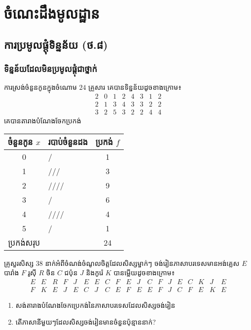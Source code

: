 \documentclass[a4paper,12pt,blue]{pptec}
\begin{document}
	\tableofcontents
	\part{ចំណេះដឹងមូលដ្ឋាន}
	\chapter{ការប្រមូលផ្ដុំទិន្នន័យ (ថ.៨)}
	\section{ទិន្នន័យដែលមិនប្រមូលផ្ដុំជាថ្នាក់}
	\begin{example}
		ការស្រង់ចំនួនកូនក្នុងចំណោម $ 24 $ គ្រួសារ គេបានទិន្នន័យដូចខាងក្រោម៖
		\begin{equation*}
		\begin{array}{cccccccc}
		2 & 0 & 1 & 2 & 4 & 3 & 1 & 2 \\
		2 & 1 & 3 & 4 & 3 & 3 & 2 & 2\\
		3 & 2 & 5 & 3 & 2 & 2 & 4 & 4
		\end{array}
		\end{equation*}
		គេបានតារាងបំណែងចែកប្រកង់
		\begin{table}[H]
			\centering
			\begin{tabular}{|c|l|c|}
				\hline
				ចំនួនកូន $ x $ & របាប់ចំនួនដង & ប្រកង់ $ f $\\
				\hline
				0 & / & 1\\
				\hline
				1 & /// & 3\\
				\hline
				2 & \cancel{////} //// & 9\\
				\hline
				3 & \cancel{////} / & 6\\
				\hline
				4 & //// & 4\\
				\hline
				5 & / & 1\\
				\hline
				ប្រកង់សរុប & & 24\\
				\hline
			\end{tabular}
		\end{table}
	\end{example}
%
\begin{example}
	គ្រូសួរសិស្ស $ 38 $ នាក់អំពីចំណង់ចំណូលចិត្តដែលសិស្សម្នាក់ៗ ចង់រៀនភាសាបរទេសមានអង់គ្លេស $ E $ បារាំង $ F $ រូស៊ី $ R $ ចិន $ C $ ជប៉ុន $ J $ និងកូរ៉េ $ K $ បានម្លើយដូចខាងក្រោម៖
	\begin{equation*}
	\begin{array}{ccccccccccccccccccc}
	E & E & R & F & J & E & E & C & F & E & J & C & F & J & E & C & K & J & E\\
	F & K & E & J & E & C & J & C & E & F & E & E & F & J & C & F & E & K & E
	\end{array}
	\end{equation*}
	\begin{enumerate}[k]
		\item សង់តារាងបំណែងចែកប្រេកង់នៃភាសាបរទេសដែលសិស្សចង់រៀន
		\item តើភាសានីមួយៗដែលសិស្សចង់រៀនមានចំនួនប៉ុន្មាននាក់?
	\end{enumerate}
	\end{example}
\end{document}
